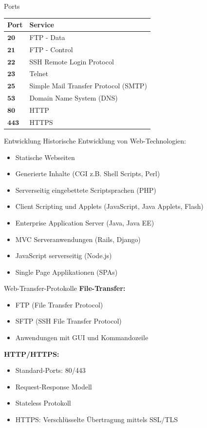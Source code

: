 \begin{corollary}{Ports}
\begin{center}
\begin{tabular}{|l|l|}
\hline
Port & Service \\
\hline
$\mathbf{20}$ & FTP - Data \\
\hline
$\mathbf{21}$ & FTP - Control \\
\hline
$\mathbf{22}$ & SSH Remote Login Protocol \\
\hline
$\mathbf{23}$ & Telnet \\
\hline
$\mathbf{25}$ & Simple Mail Transfer Protocol (SMTP) \\
\hline
$\mathbf{53}$ & Domain Name System (DNS) \\
\hline
$\mathbf{80}$ & HTTP \\
\hline
$\mathbf{443}$ & HTTPS \\
\hline
\end{tabular}
\end{center}
\end{corollary}

\begin{concept}{Entwicklung}
    Historische Entwicklung von Web-Technologien:
    \begin{itemize}
        \item Statische Webseiten
        \item Generierte Inhalte (CGI z.B. Shell Scripts, Perl)
        \item Serverseitig eingebettete Scriptsprachen (PHP)
        \item Client Scripting und Applets (JavaScript, Java Applets, Flash)
        \item Enterprise Application Server (Java, Java EE)
        \item MVC Serveranwendungen (Rails, Django)
        \item JavaScript serverseitig (Node.js)
        \item Single Page Applikationen (SPAs)
    \end{itemize}
\end{concept}

\begin{definition}{Web-Transfer-Protokolle}
    \textbf{File-Transfer:}
    \begin{itemize}
        \item FTP (File Transfer Protocol)
        \item SFTP (SSH File Transfer Protocol)
        \item Anwendungen mit GUI und Kommandozeile
    \end{itemize}

    \textbf{HTTP/HTTPS:}
    \begin{itemize}
        \item Standard-Ports: 80/443
        \item Request-Response Modell
        \item Stateless Protokoll
        \item HTTPS: Verschlüsselte Übertragung mittels SSL/TLS
    \end{itemize}
\end{definition}

